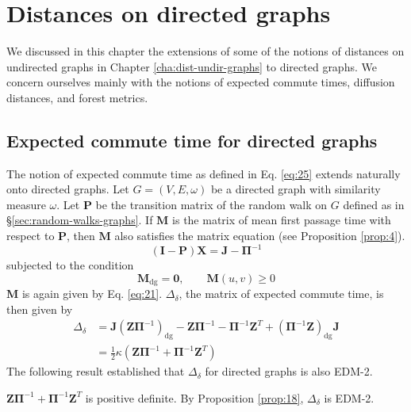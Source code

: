 \chapter{Distances on directed graphs}
\label{cha:dist-direct-graphs}
We discussed in this chapter the extensions of some of the notions of
distances on undirected graphs in Chapter \ref{cha:dist-undir-graphs}
to directed graphs. We concern ourselves mainly with the notions of
expected commute times, diffusion distances, and forest metrics. 
\section{Expected commute time for directed graphs}
\label{sec:expect-comm-time-1}
The notion of expected commute time as defined in
Eq. \eqref{eq:25} extends naturally onto directed graphs. Let $G =
(V,E,\omega)$ be a directed graph with similarity measure
$\omega$. Let $\mathbf{P}$ be the transition matrix of the random walk
on $G$ defined as in \S \ref{sec:random-walks-graphs}. 
If $\mathbf{M}$ is the matrix of mean first passage time with respect
to $\mathbf{P}$, then $\mathbf{M}$ also satisfies the matrix equation
(see Proposition \ref{prop:4}). 
\begin{equation*}
   (\mathbf{I} - \mathbf{P})\mathbf{X} = \mathbf{J} - \bm{\Pi}^{-1}
\end{equation*}
subjected to the condition 
\begin{equation*}
 \mathbf{M}_{\mathrm{dg}} = \mathbf{0}, \qquad \mathbf{M}(u,v) \geq 0   
\end{equation*}
$\mathbf{M}$ is again given by
Eq. \eqref{eq:21}. $\Delta_{\delta}$, the matrix of expected commute
time, is then given by
\begin{equation}
  \label{eq:73}
  \begin{split}
    \Delta_\delta &= \mathbf{J}(\mathbf{Z}\bm{\Pi}^{-1})_{\mathrm{dg}}
    - \mathbf{Z}\bm{\Pi}^{-1} - \bm{\Pi}^{-1}\mathbf{Z}^{T} +
    (\bm{\Pi}^{-1}\mathbf{Z})_{\mathrm{dg}}\mathbf{J} \\ \ &=
    \tfrac{1}{2}\kappa(\mathbf{Z}\bm{\Pi}^{-1} +
    \mathbf{\Pi}^{-1}\mathbf{Z}^{T})
  \end{split}
\end{equation}
%
The following result established that $\Delta_{\delta}$ for directed
graphs is also EDM-2.
\begin{proposition}
  \label{prop:19}
 $\mathbf{Z}\bm{\Pi}^{-1} + \bm{\Pi}^{-1}\mathbf{Z}^{T}$ is
 positive definite. By Proposition \ref{prop:18},
 $\Delta_{\delta}$ is EDM-2.  
\end{proposition}
